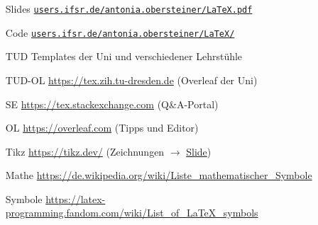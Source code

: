 \begin{frame}
\hspace{2em}
\begin{minipage}{.9\textwidth}
\begin{itemize}[<+->]
	\item[Slides] \href{https://users.ifsr.de/~antonia.obersteiner/LaTeX.pdf}{\tt users.ifsr.de/\raisebox{0.5ex}{\texttildelow}antonia.obersteiner/LaTeX.pdf}
	\item[Code] \href{https://users.ifsr.de/~antonia.obersteiner/LaTeX/}{\tt users.ifsr.de/\raisebox{0.5ex}{\texttildelow}antonia.obersteiner/LaTeX/}
	\item[TUD] Templates der Uni und verschiedener Lehrstühle
	\item[TUD-OL] \url{https://tex.zih.tu-dresden.de} (Overleaf der Uni)
	\item[SE] \url{https://tex.stackexchange.com} (Q\&A-Portal)
	\item[OL] \url{https://overleaf.com} (Tipps und Editor)
	\item[Tikz] \url{https://tikz.dev/}
		(Zeichnungen $\to$ \hyperlink{tikz-final}{Slide})
	\item[Mathe] \url{https://de.wikipedia.org/wiki/Liste_mathematischer_Symbole}
	\item[Symbole] \url{https://latex-programming.fandom.com/wiki/List_of_LaTeX_symbols}
\end{itemize}
\end{minipage}
\end{frame}
